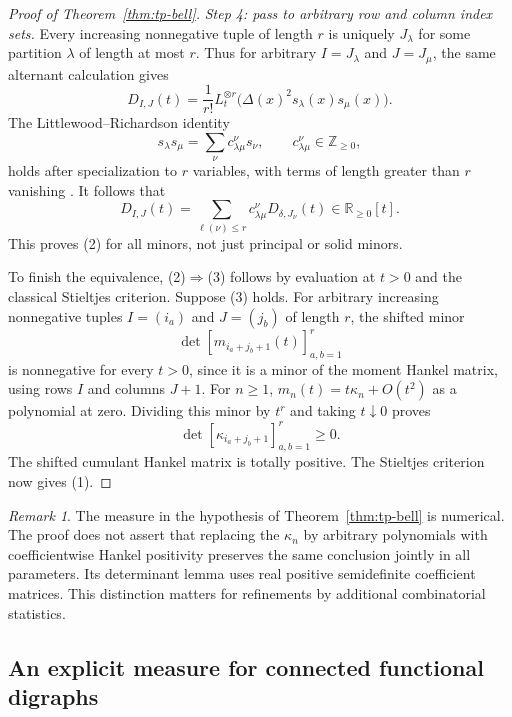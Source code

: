 \documentclass[11pt,a4paper]{article}
\theoremstyle{definition}
\theoremstyle{remark}
\newtheorem{remark}[theorem]{Remark}
\numberwithin{equation}{section}
\begin{document}
\begin{proof}[Proof of Theorem~\ref{thm:tp-bell}]
\smallskip\noindent
\emph{Step 4: pass to arbitrary row and column index sets.}
Every increasing nonnegative tuple of length $r$ is uniquely $J_\lambda$
for some partition $\lambda$ of length at most $r$.  Thus for arbitrary
$I=J_\lambda$ and $J=J_\mu$, the same alternant calculation gives
\[
 D_{I,J}(t)=\frac1{r!}L_t^{\otimes r}
   \bigl(\Delta(x)^2s_\lambda(x)s_\mu(x)\bigr).
\]
The Littlewood--Richardson identity
\[
 s_\lambda s_\mu=\sum_\nu c_{\lambda\mu}^{\nu}s_\nu,
 \qquad c_{\lambda\mu}^{\nu}\in\mathbb Z_{\geq0},
\]
holds after specialization to $r$ variables, with terms of length
greater than $r$ vanishing \cite[Chapter~I]{Macdonald1995}.
It follows that
\begin{equation}
 D_{I,J}(t)=\sum_{\ell(\nu)\leq r}
             c_{\lambda\mu}^{\nu}D_{\delta,J_\nu}(t)
           \in\mathbb R_{\geq0}[t].
 \label{eq:tp-LR-minors}
\end{equation}
This proves (2) for all minors, not just principal or solid minors.

\smallskip\noindent
To finish the equivalence, (2)$\Rightarrow$(3) follows by evaluation at
$t>0$ and the classical Stieltjes criterion.  Suppose (3) holds.  For
arbitrary increasing nonnegative tuples $I=(i_a)$ and $J=(j_b)$ of length
$r$, the shifted minor
\[
 \det[m_{i_a+j_b+1}(t)]_{a,b=1}^r
\]
is nonnegative for every $t>0$, since it is a minor of the moment Hankel
matrix, using rows $I$ and columns $J+1$.  For $n\geq1$,
$m_n(t)=t\kappa_n+O(t^2)$ as a polynomial at zero.  Dividing this minor
by $t^r$ and taking $t\downarrow0$ proves
\[
 \det[\kappa_{i_a+j_b+1}]_{a,b=1}^r\geq0.
\]
The shifted cumulant Hankel matrix is totally positive.  The Stieltjes
criterion now gives (1).
\end{proof}

\begin{remark}
The measure in the hypothesis of Theorem~\ref{thm:tp-bell} is numerical.
The proof does not assert that replacing the $\kappa_n$ by arbitrary
polynomials with coefficientwise Hankel positivity preserves the same
conclusion jointly in all parameters.  Its determinant lemma uses real
positive semidefinite coefficient matrices.  This distinction matters
for refinements by additional combinatorial statistics.
\end{remark}

\subsection{An explicit measure for connected functional digraphs}
\end{document}
